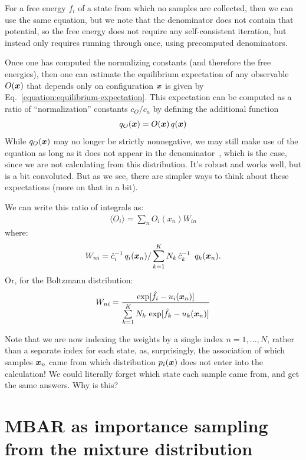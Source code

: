 \documentclass[aps,pre,twocolumn,superscriptaddress]{revtex4-1}
\newcommand{\bfv}[1]{{\mbox{\boldmath{$#1$}}}}
\newcommand{\x}{\bfv{x}}
\begin{document}
For a free energy $f_i$ of a state from which no samples are collected,
then we can use the same equation, but we note that the denominator
does not contain that potential, so the free energy does not require
any self-consistent iteration, but instead only requires running
through once, using precomputed denominators.

Once one has computed the normalizing constants (and therefore the free
energies), then one can estimate the equilibrium expectation of any
observable $O(\x)$ that depends only on configuration $\x$ is given by
Eq.~\ref{equation:equilibrium-expectation}. This expectation can be
computed as a ratio of ``normalization'' constants $c_O/c_a$ by
defining the additional function
\begin{eqnarray}
q_O(\x) = O(\x) \, q(\x) 
\end{eqnarray}
While $q_O(\x)$ may no longer be strictly nonnegative, we may still
make use of the equation as long as it does not appear in the
denominator~\cite{doss:2003}, which is the case, since we are not
calculating from this distribution. It's robust and works well, but is
a bit convoluted.  But as we see, there are simpler ways to think
about these expectations (more on that in a bit).

We can write this ratio of integrals as:
\begin{eqnarray}
\langle O_i \rangle = \sum_n O_i(x_n) W_{in} 
\end{eqnarray}
where:
\begin{eqnarray}
W_{ni} = \hat{c}_i^{-1} \, q_i(\x_n) / \sum\limits_{k=1}^K N_k \, \hat{c}_k^{-1} \,\ q_k(\x_n) \label{equation:p_weights} .
\end{eqnarray}
Or, for the Boltzmann distribution:
\begin{eqnarray}
W_{ni} = \frac{\exp[\hat{f}_i-u_i(\x_{n})]}{\sum\limits_{k=1}^K N_k \, \exp[\hat{f}_k - u_k(\x_{n})]}
\end{eqnarray}

Note that we are now indexing the weights by a single index $n =
1,\ldots,N$, rather than a separate index for each state, as,
surprisingly, the association of which samples $\x_n$ came from which
distribution $p_i(\x)$ does not enter into the calculation!  We could
literally forget which state each sample came from, and get the same
answers.  Why is this?

\section{MBAR as importance sampling from the mixture distribution}
\end{document}
